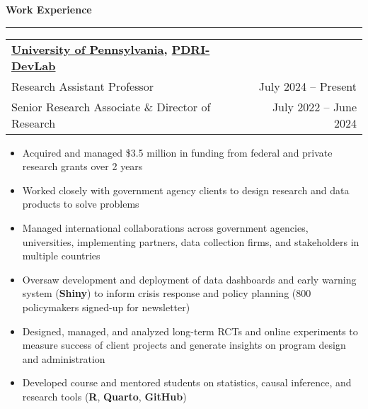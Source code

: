 \documentclass[11pt]{article}
\begin{document}
\textbf{\large Work Experience}\\
\rule[3mm]{\textwidth}{.2pt}
\noindent\begin{tabular*}{\textwidth}{@{}l@{\extracolsep{\fill}}r@{}}
\textbf{\href{https://www.polisci.upenn.edu/}{University of Pennsylvania}, \href{https://web.sas.upenn.edu/dev-lab/}{PDRI-DevLab}}\\
Research Assistant Professor & July 2024 -- Present\\
Senior Research Associate \& Director of Research & July 2022 -- June 2024\\
\end{tabular*}
\begin{itemize}[itemsep=0mm, parsep=0pt]
\item Acquired and managed \$3.5 million in funding from federal and private research grants over 2 years
\item Worked closely with government agency clients to design research and data products to solve problems
\item Managed international collaborations across government agencies, universities, implementing partners, data collection firms, and stakeholders in multiple countries
\item Oversaw development and deployment of data dashboards and early warning system (\textbf{Shiny}) to inform crisis response and policy planning (800 policymakers signed-up for newsletter)
\item Designed, managed, and analyzed long-term RCTs and online experiments to measure success of client projects and generate insights on program design and administration
\item Developed course and mentored students on statistics, causal inference, and research tools (\textbf{R}, \textbf{Quarto}, \textbf{GitHub}) 
\end{itemize}
% 
\end{document}
